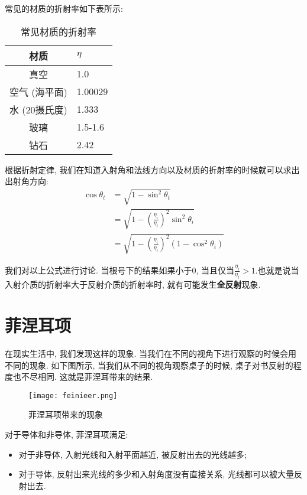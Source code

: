 常见的材质的折射率如下表所示: 

\begin{table}[H]
	\centering
	\begin{tabular}{cl}
		\hline
		材质       & $\eta$  \\ \hline
		真空       & 1.0     \\
		空气 (海平面)   & 1.00029 \\
		水 (20摄氏度)  & 1.333   \\
		玻璃       & 1.5-1.6 \\
		钻石       & 2.42  \\ \hline
	\end{tabular}
	\caption{常见材质的折射率}
\end{table}

根据折射定律, 我们在知道入射角和法线方向以及材质的折射率的时候就可以求出出射角方向: 
\begin{equation}
	\begin{split}
		\cos\theta_t&=\sqrt{1-\sin^2\theta_t}\\
		&=\sqrt{1-(\frac{\eta_i}{\eta_t})^2\sin^2\theta_i}\\
		&=\sqrt{1-(\frac{\eta_i}{\eta_t})^2(1-\cos^2\theta_i)}
	\end{split}
\end{equation}

我们对以上公式进行讨论. 当根号下的结果如果小于0, 当且仅当$\frac{\eta_i}{\eta_t}>1$.也就是说当入射介质的折射率大于反射介质的折射率时, 就有可能发生\textbf{全反射}现象. 

\section{菲涅耳项}

在现实生活中, 我们发现这样的现象. 当我们在不同的视角下进行观察的时候会用不同的现象. 如下图所示, 当我们从不同的视角观察桌子的时候, 桌子对书反射的程度也不尽相同. 这就是菲涅耳带来的结果. 

\begin{figure}[H]
	\centering
	\texttt{[image: feinieer.png]}
	\caption{菲涅耳项带来的现象}
	\label{fig:fne}
\end{figure}

对于导体和非导体, 菲涅耳项满足: 
\begin{itemize}
	\item 对于非导体, 入射光线和入射平面越近, 被反射出去的光线越多; 
	\item 对于导体, 反射出来光线的多少和入射角度没有直接关系, 光线都可以被大量反射出去. 
\end{itemize}

